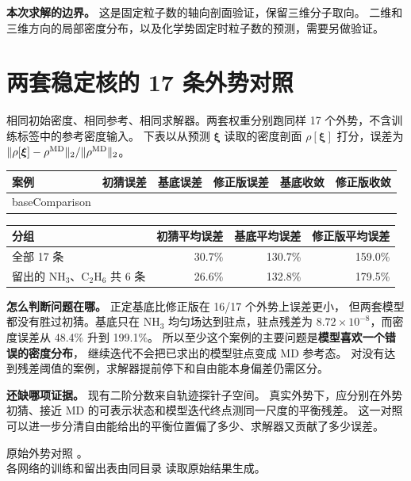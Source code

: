 \documentclass[UTF8,fontset=fandol,11pt]{ctexart}
\newcommand{\xiF}{\bm\xi}
\newcommand{\val}[1]{\csname #1\endcsname}
\begin{document}
\textbf{本次求解的边界。} 这是固定粒子数的轴向剖面验证，保留三维分子取向。
二维和三维方向的局部密度分布，以及化学势固定时粒子数的预测，需要另做验证。

\clearpage
\section{两套稳定核的 17 条外势对照}\label{sec:fieldresult}

相同初始密度、相同参考、相同求解器。两套权重分别跑同样 17 个外势，不含训练标签中的参考密度输入。
下表以从预测 $\xiF$ 读取的密度剖面 $\rho[\xiF]$ 打分，误差为 \(\|\rho[\xiF]-\rho^{\rm MD}\|_2/\|\rho^{\rm MD}\|_2\)。

\begin{center}\small
\begin{tabular}{lrrrrr}\toprule
案例 & 初猜误差 & 基底误差 & 修正版误差 & 基底收敛 & 修正版收敛\\
\midrule\val{baseComparison}\bottomrule
\end{tabular}
\end{center}

\begin{center}\small
\begin{tabular}{lrrr}\toprule
分组 & 初猜平均误差 & 基底平均误差 & 修正版平均误差\\
\midrule
全部 17 条 & 30.7\% & 130.7\% & 159.0\%\\
留出的 NH$_3$、C$_2$H$_6$ 共 6 条 & 26.6\% & 132.8\% & 179.5\%\\
\bottomrule
\end{tabular}
\end{center}

\textbf{怎么判断问题在哪。} 正定基底比修正版在 16/17 个外势上误差更小，
但两套模型都没有胜过初猜。基底只在 NH$_3$ 均匀场达到驻点，驻点残差为
\(8.72\times10^{-8}\)，而密度误差从 48.4\% 升到 199.1\%。
所以至少这个案例的主要问题是\textbf{模型喜欢一个错误的密度分布}，
继续迭代不会把已求出的模型驻点变成 MD 参考态。
对没有达到残差阈值的案例，求解器提前停下和自由能本身偏差仍需区分。

\textbf{还缺哪项证据。} 现有二阶分数来自轨迹探针子空间。
真实外势下，应分别在外势初猜、接近 MD 的可表示状态和模型迭代终点测同一尺度的平衡残差。
这一对照可以进一步分清自由能给出的平衡位置偏了多少、求解器又贡献了多少误差。

{\footnotesize 原始外势对照 。\\
各网络的训练和留出表由同目录  读取原始结果生成。}
\end{document}
